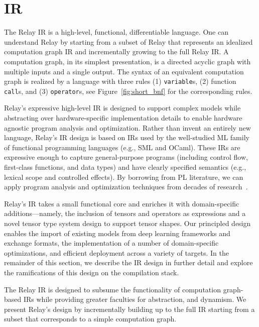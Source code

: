 \section{IR}



The Relay IR is a high-level, functional, differentiable language.
One can understand Relay by starting from a subset of Relay
  that represents an idealized computation graph IR and
  incrementally growing to the full Relay IR.
A computation graph, in its simplest presentation, is a directed acyclic
  graph with multiple inputs and a single output.
The syntax of an equivalent computation graph is realized by
  a language with three rules (1) \verb|variable|s, (2) function \verb|call|s,
  and (3) \verb|operator|s, see Figure~\ref{fig:short_bnf} for the corresponding rules.

Relay's expressive high-level IR is designed to support
  complex models while abstracting over hardware-specific
  implementation details to enable hardware agnostic program
  analysis and optimization.
Rather than invent an entirely new language,
  Relay's IR design is based on IRs used by the well-studied ML family of
  functional programming languages (e.g., SML and OCaml).
These IRs are expressive enough to capture general-purpose programs
  (including control flow, first-class functions, and data types)
  and have clearly specified semantics (e.g., lexical scope and controlled effects).
By borrowing from PL literature,
  we can apply program analysis and optimization techniques from decades of research~\citep{haskell_vector}.

Relay's IR takes a small functional core and enriches it with domain-specific additions---namely,
  the inclusion of tensors and operators as expressions
  and a novel tensor type system design to support tensor shapes.
Our principled design
  enables the import of existing models from deep learning frameworks and exchange formats,
  the implementation of a number of domain-specific optimizations,
  and efficient deployment across a variety of targets.
In the remainder of this section,
  we describe the IR design in further detail
  and explore the ramifications of this design on the compilation stack.

The Relay IR is designed
  to subsume the functionality of computation graph-based IRs
  while providing greater faculties for abstraction, and dynamism.
We present Relay's design by incrementally building up to the full IR
  starting from a subset that corresponds to a simple computation graph.

